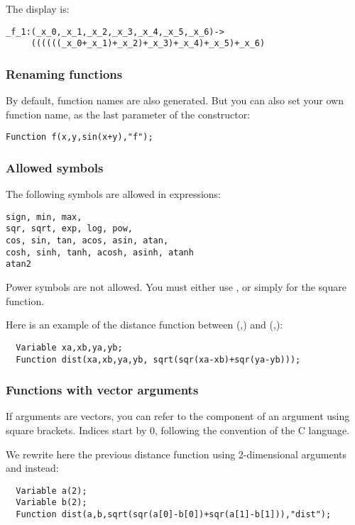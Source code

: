 The display is:
\begin{verbatim}
_f_1:(_x_0,_x_1,_x_2,_x_3,_x_4,_x_5,_x_6)->
     ((((((_x_0+_x_1)+_x_2)+_x_3)+_x_4)+_x_5)+_x_6)
\end{verbatim}

\subsubsection{Renaming functions}

By default, function names are also generated. But you can also set your own function name, as the last parameter of the constructor:
\begin{lstlisting}
Function f(x,y,sin(x+y),"f");
\end{lstlisting}

\subsubsection{Allowed symbols}

The following symbols are allowed in expressions:
\begin{verbatim}
sign, min, max,
sqr, sqrt, exp, log, pow, 
cos, sin, tan, acos, asin, atan,
cosh, sinh, tanh, acosh, asinh, atanh
atan2
\end{verbatim}

Power symbols \cf{^} are not allowed. You must
either use , or simply  for the square function.

Here is an example of the distance function between (,) and
(,):

\begin{lstlisting}
  Variable xa,xb,ya,yb;
  Function dist(xa,xb,ya,yb, sqrt(sqr(xa-xb)+sqr(ya-yb)));
\end{lstlisting}

\subsubsection{Functions with vector arguments}

If arguments are vectors, you can refer to the component
of an argument using square brackets. Indices start by 0,
following the convention of the C language.

We rewrite here the previous distance function using 2-dimensional
arguments  and  instead:
\begin{lstlisting}
  Variable a(2);
  Variable b(2);
  Function dist(a,b,sqrt(sqr(a[0]-b[0])+sqr(a[1]-b[1])),"dist");
\end{lstlisting}

